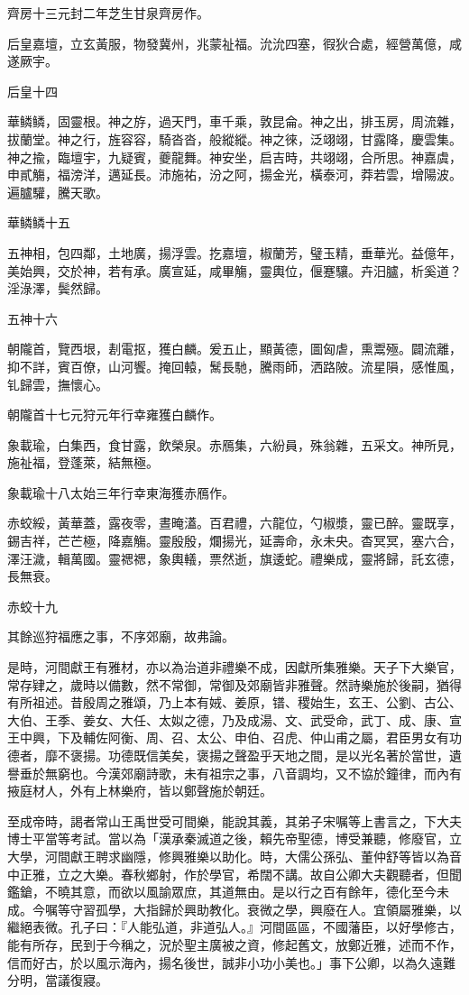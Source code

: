 \begin{pinyinscope}
齊房十三元封二年芝生甘泉齊房作。

后皇嘉壇，立玄黃服，物發冀州，兆蒙祉福。沇沇四塞，徦狄合處，經營萬億，咸遂厥宇。

后皇十四

華鳞鳞，固靈根。神之斿，過天門，車千乘，敦昆侖。神之出，排玉房，周流雜，拔蘭堂。神之行，旌容容，騎沓沓，般縱縱。神之徠，泛翊翊，甘露降，慶雲集。神之揄，臨壇宇，九疑賓，夔龍舞。神安坐，启吉時，共翊翊，合所思。神嘉虞，申貳觴，福滂洋，邁延長。沛施祐，汾之阿，揚金光，橫泰河，莽若雲，增陽波。遍臚驩，騰天歌。

華鳞鳞十五

五神相，包四鄰，土地廣，揚浮雲。扢嘉壇，椒蘭芳，璧玉精，垂華光。益億年，美始興，交於神，若有承。廣宣延，咸畢觴，靈輿位，偃蹇驤。卉汨臚，析奚道？淫淥澤，鬓然歸。

五神十六

朝隴首，覽西垠，剨電抠，獲白麟。爰五止，顯黃德，圖匈虐，熏鬻殛。闢流離，抑不詳，賓百僚，山河饗。掩回轅，鬗長馳，騰雨師，洒路陂。流星隕，感惟風，钆歸雲，撫懷心。

朝隴首十七元狩元年行幸雍獲白麟作。

象載瑜，白集西，食甘露，飲榮泉。赤鴈集，六紛員，殊翁雜，五采文。神所見，施祉福，登蓬萊，結無極。

象載瑜十八太始三年行幸東海獲赤鴈作。

赤蛟綏，黃華蓋，露夜零，晝晻濭。百君禮，六龍位，勺椒漿，靈已醉。靈既享，錫吉祥，芒芒極，降嘉觴。靈殷殷，爛揚光，延壽命，永未央。杳冥冥，塞六合，澤汪濊，輯萬國。靈禗禗，象輿轙，票然逝，旗逶蛇。禮樂成，靈將歸，託玄德，長無衰。

赤蛟十九

其餘巡狩福應之事，不序郊廟，故弗論。

是時，河間獻王有雅材，亦以為治道非禮樂不成，因獻所集雅樂。天子下大樂官，常存肄之，歲時以備數，然不常御，常御及郊廟皆非雅聲。然詩樂施於後嗣，猶得有所祖述。昔殷周之雅頌，乃上本有娀、姜原，镨、稷始生，玄王、公劉、古公、大伯、王季、姜女、大任、太姒之德，乃及成湯、文、武受命，武丁、成、康、宣王中興，下及輔佐阿衡、周、召、太公、申伯、召虎、仲山甫之屬，君臣男女有功德者，靡不褒揚。功德既信美矣，褒揚之聲盈乎天地之間，是以光名著於當世，遺譽垂於無窮也。今漢郊廟詩歌，未有祖宗之事，八音調均，又不協於鐘律，而內有掖庭材人，外有上林樂府，皆以鄭聲施於朝廷。

至成帝時，謁者常山王禹世受可間樂，能說其義，其弟子宋嘱等上書言之，下大夫博士平當等考試。當以為「漢承秦滅道之後，賴先帝聖德，博受兼聽，修廢官，立大學，河間獻王聘求幽隱，修興雅樂以助化。時，大儒公孫弘、董仲舒等皆以為音中正雅，立之大樂。春秋鄉射，作於學官，希闊不講。故自公卿大夫觀聽者，但聞鑑鎗，不曉其意，而欲以風諭眾庶，其道無由。是以行之百有餘年，德化至今未成。今嘱等守習孤學，大指歸於興助教化。衰微之學，興廢在人。宜領屬雅樂，以繼絕表微。孔子曰：『人能弘道，非道弘人。』河間區區，不國藩臣，以好學修古，能有所存，民到于今稱之，況於聖主廣被之資，修起舊文，放鄭近雅，述而不作，信而好古，於以風示海內，揚名後世，誠非小功小美也。」事下公卿，以為久遠難分明，當議復寢。


\end{pinyinscope}
